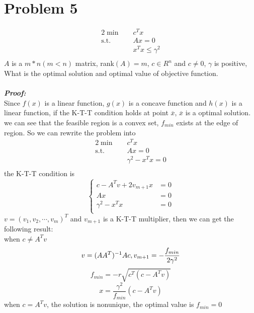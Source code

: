 \documentclass[paper=a4, fontsize=11pt]{scrartcl} %
\numberwithin{equation}{section} %
\numberwithin{figure}{section} %
\numberwithin{table}{section} %
\begin{document}
\section{Problem 5}
\begin{alignat}{2}          \nonumber
\min\quad & c^Tx\\    \nonumber
\mbox{s.t.}\quad            \nonumber
& Ax = 0\\         \nonumber
& x^Tx \leq \gamma^2\\         \nonumber
\end{alignat}
$A$ is a $m*n (m<n)$ matrix, rank$(A) = m $, $c\in R^n$ and $c\neq0$, $\gamma$ is positive, What is the optimal solution and optimal value of objective function.\\
\\
\emph{\textbf{Proof:}}\\
Since $f(x)$ is a linear function, $g(x)$ is a concave function and $h(x)$ is a linear function, if the K-T-T condition holds at point $\overline{x}$, $\overline{x}$ is a optimal solution.\\
we can see that the feasible region is a convex set, $f_{min}$ exists at the edge of region. So we can rewrite the problem into
\begin{alignat}{2}          \nonumber
\min\quad & c^Tx\\    \nonumber
\mbox{s.t.}\quad            \nonumber
& Ax = 0\\         \nonumber
&  \gamma^2-x^Tx = 0\\         \nonumber
\end{alignat}
the K-T-T condition is
\begin{equation} \nonumber
\left\{
\begin{aligned}
c-A^Tv+2v_{m+1}x &= 0\\
Ax &= 0\\
\gamma^2-x^Tx &= 0\\
\end{aligned}
\right.
\end{equation}
$v=(v_1,v_2,\cdots,v_m)^T$ and $v_{m+1}$ is a K-T-T multiplier, then we can get the following result:\\
when $c\neq A^Tv$
\begin{equation} \nonumber
v = (AA^T)^{-1}Ac, v_{m+1}= -\frac{f_{min}}{2\gamma^2}\\
\end{equation}
\begin{equation} \nonumber
f_{min} = -r\sqrt{c^T(c-A^Tv)}
\end{equation}
\begin{equation} \nonumber
x = \frac{\gamma^2}{f_{min}}(c-A^Tv)
\end{equation}
when $c=A^Tv$, the solution is nonunique, the optimal value is $f_{min}=0$
\end{document}

